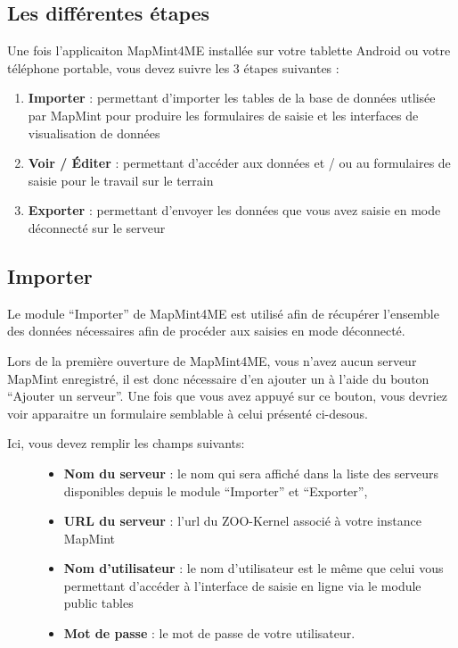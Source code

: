 \documentclass[letterpaper,10pt,french]{sphinxmanual}
\begin{document}
\subsection{Les différentes étapes}
\label{tables/mapmint4me:les-differentes-etapes}
Une fois l'applicaiton MapMint4ME installée sur votre tablette Android ou votre téléphone portable, vous devez suivre les 3 étapes suivantes :
\begin{enumerate}
\item {} 
\textbf{Importer} : permettant d'importer les tables de la base de données utlisée par MapMint pour produire les formulaires de saisie et les interfaces de visualisation de données

\item {} 
\textbf{Voir / Éditer} : permettant d'accéder aux données et / ou au formulaires de saisie pour le travail sur le terrain

\item {} 
\textbf{Exporter} : permettant d'envoyer les données que vous avez saisie en mode déconnecté sur le serveur

\end{enumerate}


\subsection{Importer}
\label{tables/mapmint4me:importer}
Le module ``Importer'' de MapMint4ME est utilisé afin de récupérer l'ensemble des données nécessaires afin de procéder aux saisies en mode déconnecté.

Lors de la première ouverture de MapMint4ME, vous n'avez aucun serveur MapMint enregistré, il est donc nécessaire d'en ajouter un à l'aide du bouton ``Ajouter un serveur''.
Une fois que vous avez appuyé sur ce bouton, vous devriez voir apparaitre un formulaire semblable à celui présenté ci-desous.
\begin{description}
\item[{Ici, vous devez remplir les champs suivants:}] \leavevmode\begin{itemize}
\item {} 
\textbf{Nom du serveur} : le nom qui sera affiché dans la liste des serveurs disponibles depuis le module ``Importer'' et ``Exporter'',

\item {} 
\textbf{URL du serveur} : l'url du ZOO-Kernel associé à votre instance MapMint

\item {} 
\textbf{Nom d'utilisateur} : le nom d'utilisateur est le même que celui vous permettant d'accéder à l'interface de saisie en ligne via le module public tables

\item {} 
\textbf{Mot de passe} : le mot de passe de votre utilisateur.

\end{itemize}

\end{description}
\end{document}
